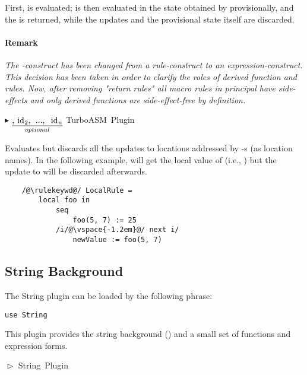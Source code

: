 \documentclass{article}
\makeatletter
\newcommand{\ruleform}[2]{\pform{$\blacktriangleright$}{#1}{#2}}
\newcommand{\opform}[2]{\pform{$\vartriangleright$}{#1}{#2}}
\newcommand{\pform}[3]{\vspace*{4mm} \noindent #1 #2 \vspace{1mm}\textcolor[gray]{0.7}{\dotfill}\mbox{{\sffamily \footnotesize #3}}}
\newcommand{\optional}[1]{$\underset{optional}{\underline{\mbox{#1}}}$}
\newcommand{\indexrule}[1]{\index{#1 rule@\asm{#1} rule}}
\makeatother
\begin{document}
First,  is evaluated;  is then evaluated in the state obtained by provisionally, and the  is returned, while 
the updates and the provisional state itself are discarded.

\paragraph{Remark}
\textit{The -construct has been changed from a \emph{rule}-construct to an \emph{expression}-construct. This decision has been taken in order to clarify the roles of derived function and rules. Now, after removing "return rules" all macro rules in principal have side-effects and only derived functions are side-effect-free by definition.}

\ruleform{
	\hspace{-.4em}
	\optional{, \asm{id$_2$, ..., id$_n$}}
	\asm{in rule}
}{TurboASM Plugin}
\indexrule{local}

Evaluates  but discards all the updates to locations addressed by -s (as location names). 
In the following example,  will get the local value of  (i.e., ) 
but the update to  will be discarded afterwards.

\begin{lstlisting}
	/@\rulekeywd@/ LocalRule =
		local foo in
			seq
				foo(5, 7) := 25
			/i/@\vspace{-1.2em}@/ next i/
				newValue := foo(5, 7)
\end{lstlisting}


\subsection{String Background}
\label{string}

The String plugin can be loaded by the following  phrase:

\begin{lstlisting}
use String
\end{lstlisting}

\noindent This plugin provides the string background () and
a small set of functions and expression forms. 

\opform{
}{String Plugin}
\end{document}
